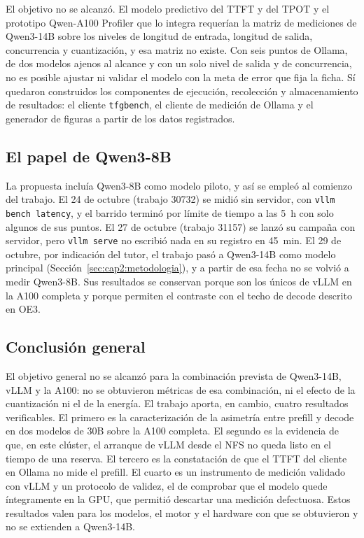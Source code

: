 El objetivo no se alcanzó. El modelo predictivo del TTFT y del TPOT y el prototipo Qwen-A100 Profiler que lo integra requerían la matriz de mediciones de Qwen3-14B sobre los niveles de longitud de entrada, longitud de salida, concurrencia y cuantización, y esa matriz no existe. Con seis puntos de Ollama, de dos modelos ajenos al alcance y con un solo nivel de salida y de concurrencia, no es posible ajustar ni validar el modelo con la meta de error que fija la ficha. Sí quedaron construidos los componentes de ejecución, recolección y almacenamiento de resultados: el cliente \texttt{tfgbench}, el cliente de medición de Ollama y el generador de figuras a partir de los datos registrados.

\subsection{El papel de Qwen3-8B}

La propuesta incluía Qwen3-8B como modelo piloto, y así se empleó al comienzo del trabajo. El 24 de octubre (trabajo 30732) se midió sin servidor, con \texttt{vllm bench latency}, y el barrido terminó por límite de tiempo a las 5~h con solo algunos de sus puntos. El 27 de octubre (trabajo 31157) se lanzó su campaña con servidor, pero \texttt{vllm serve} no escribió nada en su registro en 45~min. El 29 de octubre, por indicación del tutor, el trabajo pasó a Qwen3-14B como modelo principal (Sección~\ref{sec:cap2:metodologia}), y a partir de esa fecha no se volvió a medir Qwen3-8B. Sus resultados se conservan porque son los únicos de vLLM en la A100 completa y porque permiten el contraste con el techo de decode descrito en OE3.

\subsection{Conclusión general}

El objetivo general no se alcanzó para la combinación prevista de Qwen3-14B, vLLM y la A100: no se obtuvieron métricas de esa combinación, ni el efecto de la cuantización ni el de la energía. El trabajo aporta, en cambio, cuatro resultados verificables. El primero es la caracterización de la asimetría entre prefill y decode en dos modelos de 30B sobre la A100 completa. El segundo es la evidencia de que, en este clúster, el arranque de vLLM desde el NFS no queda listo en el tiempo de una reserva. El tercero es la constatación de que el TTFT del cliente en Ollama no mide el prefill. El cuarto es un instrumento de medición validado con vLLM y un protocolo de validez, el de comprobar que el modelo quede íntegramente en la GPU, que permitió descartar una medición defectuosa. Estos resultados valen para los modelos, el motor y el hardware con que se obtuvieron y no se extienden a Qwen3-14B.

